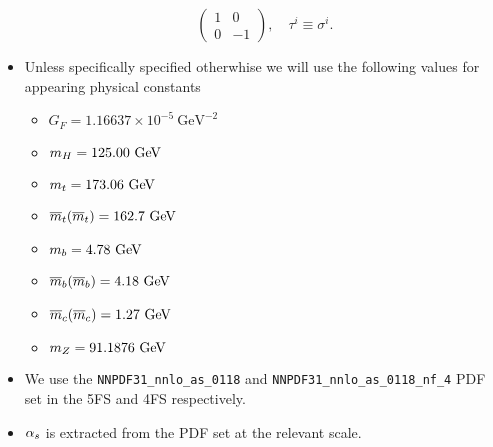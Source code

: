 \begin{itemize}
\begin{equation}
\begin{pmatrix}
                1 & 0 \\
                0 & -1
            \end{pmatrix}, \quad \tau^i \equiv \sigma^i.
        \end{equation}
        \item Unless specifically specified otherwhise we will use the following values for appearing physical constants
        \begin{itemize}
        \item $G_F =  1.16637 \times 10^{-5}\ \text{GeV}^{-2}$
        \item $m_H = 125.00 \ \text{GeV}$
        \item $m_t = 173.06 \ \text{GeV}$
        \item $\msMass{t} = 162.7 \ \GeV$
        \item $m_b = 4.78 \ \text{GeV}$
        \item $\msMass{b} = 4.18 \ \GeV$
        \item $\msMass{c} =  1.27\ \GeV$
        \item $m_Z = 91.1876 \ \text{GeV}$
        \end{itemize}
        \item We use the \texttt{NNPDF31\_nnlo\_as\_0118} and \texttt{NNPDF31\_nnlo\_as\_0118\_nf\_4} \acs{PDF} set in the 5\acs{FS} and 4\acs{FS} respectively.
        \item $\alpha_s$ is extracted from the \acs{PDF} set at the relevant scale.
    \end{itemize}


\endgroup
